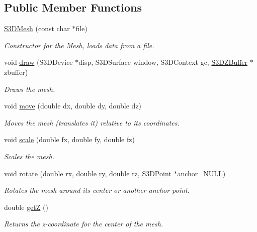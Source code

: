 \subsection*{Public Member Functions}
\begin{DoxyCompactItemize}
\item 
\hyperlink{class_s3_d_mesh_a810cf0f60312bc574e347d6248499258}{S3DMesh} (const char $\ast$file)
\begin{DoxyCompactList}\small\item\em Constructor for the Mesh, loads data from a file. \item\end{DoxyCompactList}\item 
void \hyperlink{class_s3_d_mesh_afc47824c491991604931f4ccb0520cd1}{draw} (S3DDevice $\ast$disp, S3DSurface window, S3DContext gc, \hyperlink{class_s3_d_z_buffer}{S3DZBuffer} $\ast$zbuffer)
\begin{DoxyCompactList}\small\item\em Draws the mesh. \item\end{DoxyCompactList}\item 
void \hyperlink{class_s3_d_mesh_a15edf10bf8a749627f11235c618734f7}{move} (double dx, double dy, double dz)
\begin{DoxyCompactList}\small\item\em Moves the mesh (translates it) relative to its coordinates. \item\end{DoxyCompactList}\item 
void \hyperlink{class_s3_d_mesh_ad1de35530a123dbb515e37afc8ecc0e3}{scale} (double fx, double fy, double fz)
\begin{DoxyCompactList}\small\item\em Scales the mesh. \item\end{DoxyCompactList}\item 
void \hyperlink{class_s3_d_mesh_affff1ac3ef33b293a9ec9881a4e13993}{rotate} (double rx, double ry, double rz, \hyperlink{class_s3_d_point}{S3DPoint} $\ast$anchor=NULL)
\begin{DoxyCompactList}\small\item\em Rotates the mesh around its center or another anchor point. \item\end{DoxyCompactList}\item 
double \hyperlink{class_s3_d_mesh_aa11c4dd0ce01443c07afaabc0e206881}{getZ} ()
\begin{DoxyCompactList}\small\item\em Returns the z-\/coordinate for the center of the mesh. \item\end{DoxyCompactList}\end{DoxyCompactItemize}


